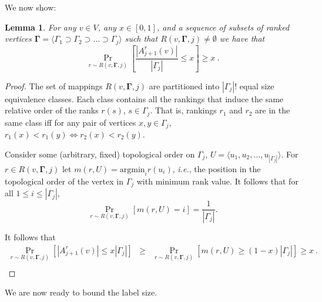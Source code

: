\documentclass[11pt]{article}
\newcommand{\argmin}{\mathrm{argmin}}
\newcommand{\bGamma}{\boldsymbol{\Gamma}}
\theoremstyle{plain}
\newtheorem{lem}[thm]{Lemma}
\theoremstyle{definition}
\theoremstyle{remark}
\numberwithin{equation}{section}
\begin{document}
We now show:
\begin{lem}\label{L-set-size} For any  $v\in V$, any $x\in [0,1]$,
 and a sequence of
subsets of ranked vertices  $\bGamma = \langle \Gamma_1 \supset
\Gamma_2 \supset \dots \supset \Gamma_{j}\rangle$   such that
$R(v,\bGamma,j) \not=\emptyset$ we have that
$$\Pr_{r\sim
  R(v,\bGamma,j)}\left[\frac{|A^r_{j+1}(v)|}{|\Gamma_{j}|} \leq
  x\right]   \geq x\ .$$
\end{lem}
\begin{proof}
 The set of mappings $R(v,\bGamma,j)$ are partitioned into
 $|\Gamma_{j}|!$ equal size equivalence classes. Each class
contains  all the rankings that induce the same
 relative order of the ranks
$r(s)$, $s\in \Gamma_{j}$. That is,  rankings $r_1$ and $r_2$ are in
the same class  iff for any pair of vertices $x,y \in \Gamma_j$,
$r_1(x) < r_1(y) \Leftrightarrow r_2(x) < r_2(y)$.

Consider some (arbitrary, fixed) topological order on $\Gamma_{j}$,
$U=\langle u_1, u_2, \ldots, u_{|\Gamma_{j}|}\rangle$. For $r\in
R(v,\bGamma,j)$ let $m(r,U) = \argmin_i r(u_i)$, {\sl i.e.}, the
position in the topological order of the vertex in $\Gamma_j$ with minimum rank value.
It follows that for all $1 \leq i \leq |\Gamma_{j}|$,
   $$\Pr_{r\sim R(v,\bGamma,j)} [ m(r,U) = i ] = \frac{1}{|\Gamma_{j}|}.$$

It follows that
  \begin{eqnarray*}
\Pr_{r\sim R(v,\bGamma,j)} \left[|A^r_{j+1}(v)| \leq x |\Gamma_{j}|
\right] &\geq& \Pr_{r\sim R(v,\bGamma,j)} \left[ m(r,U) \geq (1-x)
  |\Gamma_{j}| \right] \geq   x \ .
\\ \end{eqnarray*}
\end{proof}

 We are now
ready to bound the label size.
\end{document}
